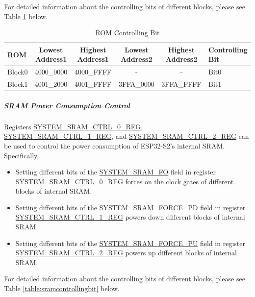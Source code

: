 \documentclass[main\_\_EN.tex]{subfiles}
\begin{document}
For detailed information about the controlling bits of different blocks, please see Table \ref{table:romcontrollingbit} below.

\begin{longtable}[c]{|l|c|c|c|c|l| }
\caption{ROM Controlling Bit}
\label{table:romcontrollingbit}
\\\hline
\rowcolor{lightgray}
ROM & Lowest Address1 & Highest Address1 & Lowest Address2 & Highest Address2 & Controlling Bit \\
\hline
\endhead
Block0  & \hexprefix{}4000\_0000    & \hexprefix{}4000\_FFFF  &- & -  & Bit0 \\\hline
Block1  & \hexprefix{}4001\_2000    & \hexprefix{}4001\_FFFF  & \hexprefix{}3FFA\_0000  & \hexprefix{}3FFA\_FFFF & Bit1 \\\hline
\end{longtable}


\subparagraph{SRAM Power Consumption Control}

Registers \hyperref[regdesc:SYSTEMSRAMCTRL0REG]{SYSTEM\_SRAM\_CTRL\_0\_REG}, \hyperref[regdesc:SYSTEMSRAMCTRL1REG]{SYSTEM\_SRAM\_CTRL\_1\_REG}, and \hyperref[regdesc:SYSTEMSRAMCTRL2REG]{SYSTEM\_SRAM\_CTRL\_2\_REG} can be used to control the power consumption of ESP32-S2's internal SRAM. Specifically,

\begin{itemize}
    \item Setting different bits of the \hyperref[fielddesc:SYSTEMSRAMFO]{SYSTEM\_SRAM\_FO} field in register \hyperref[regdesc:SYSTEMSRAMCTRL0REG]{SYSTEM\_SRAM\_CTRL\_0\_REG} forces on the clock gates of different blocks of internal SRAM.
    \item Setting different bits of the \hyperref[fielddesc:SYSTEMSRAMFORCEPD]{SYSTEM\_SRAM\_FORCE\_PD} field in register \hyperref[regdesc:SYSTEMSRAMCTRL1REG]{SYSTEM\_SRAM\_CTRL\_1\_REG} powers down different blocks of internal SRAM.
    \item Setting different bits of the \hyperref[fielddesc:SYSTEMSRAMFORCEPU]{SYSTEM\_SRAM\_FORCE\_PU} field in register \hyperref[regdesc:SYSTEMSRAMCTRL2REG]{SYSTEM\_SRAM\_CTRL\_2\_REG} powers up different blocks of internal SRAM.
\end{itemize}

For detailed information about the controlling bits of different blocks, please see Table \ref{table:sramcontrollingbit} below.
\end{document}

